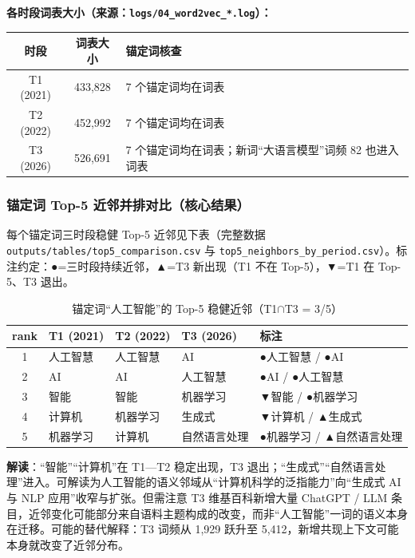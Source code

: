 \documentclass[12pt,a4paper]{article}
\begin{document}
\textbf{各时段词表大小（来源：\texttt{logs/04\_word2vec\_*.log}）：}

\begin{table}[H]
\centering
\renewcommand{\arraystretch}{1.25}
\begin{tabular}{|c|c|l|}
\hline
\textbf{时段} & \textbf{词表大小} & \textbf{锚定词核查} \\
\hline
T1 (2021) & 433,828 & 7 个锚定词均在词表 \\
\hline T2 (2022) & 452,992 & 7 个锚定词均在词表 \\
\hline T3 (2026) & 526,691 & 7 个锚定词均在词表；新词“大语言模型”词频 82 也进入词表 \\
\hline
\end{tabular}
\end{table}

\subsubsection{锚定词 Top-5 近邻并排对比（核心结果）}

每个锚定词三时段稳健 Top-5 近邻见下表（完整数据 \texttt{outputs/tables/top5\_comparison.csv} 与 \texttt{top5\_neighbors\_by\_period.csv}）。标注约定：●=三时段持续近邻，▲=T3 新出现（T1 不在 Top-5），▼=T1 在 Top-5、T3 退出。

\begin{longtable}{|c|p{2.4cm}|p{2.4cm}|p{2.4cm}|p{4.5cm}|}
\caption{锚定词“人工智能”的 Top-5 稳健近邻（T1$\cap$T3 = 3/5）} \\
\hline
\textbf{rank} & \textbf{T1 (2021)} & \textbf{T2 (2022)} & \textbf{T3 (2026)} & \textbf{标注} \\
\hline
1 & 人工智慧 & 人工智慧 & AI & ●人工智慧 / ●AI \\
\hline
2 & AI & AI & 人工智慧 & ●AI / ●人工智慧 \\
\hline
3 & 智能 & 智能 & 机器学习 & ▼智能 / ●机器学习 \\
\hline
4 & 计算机 & 机器学习 & 生成式 & ▼计算机 / ▲生成式 \\
\hline
5 & 机器学习 & 计算机 & 自然语言处理 & ●机器学习 / ▲自然语言处理 \\
\hline
\end{longtable}

\textbf{解读}：“智能”“计算机”在 T1—T2 稳定出现，T3 退出；“生成式”“自然语言处理”进入。可解读为人工智能的语义邻域从“计算机科学的泛指能力”向“生成式 AI 与 NLP 应用”收窄与扩张。但需注意 T3 维基百科新增大量 ChatGPT / LLM 条目，近邻变化可能部分来自语料主题构成的改变，而非“人工智能”一词的语义本身在迁移。可能的替代解释：T3 词频从 1,929 跃升至 5,412，新增共现上下文可能本身就改变了近邻分布。
\end{document}

